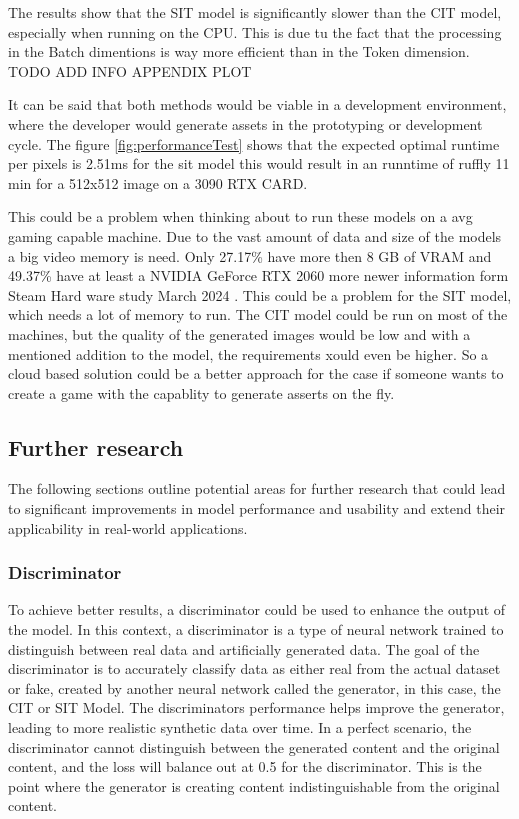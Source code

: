     The results show that the SIT model is significantly slower than the CIT model, especially when running on the CPU. This is due tu the fact that the processing in the Batch dimentions is way more efficient than in the Token dimension. TODO ADD INFO APPENDIX PLOT

    It can be said that both methods would be viable in a development environment, where the developer would generate assets in the prototyping or development cycle. The figure \autoref{fig:performanceTest} shows that the expected optimal runtime per pixels is 2.51ms for the sit model this would result in an runntime of ruffly 11 min for a 512x512 image on a 3090 RTX CARD.
    
    This could be a problem when thinking about to run these models on a avg gaming capable machine. Due to the vast amount of data and size of the models a big video memory is need. Only 27.17\% have more then 8 GB of VRAM and 49.37\% have at least a NVIDIA GeForce RTX 2060 more newer information form Steam Hard ware study March 2024 \autocite{Valve2024}. This could be a problem for the SIT model, which needs a lot of memory to run. The CIT   model could be run on most of the machines, but the quality of the generated images would be low and with a mentioned addition to the model, the requirements xould even be higher. So a cloud based solution could be a better approach for the case if someone wants to create a game with the capablity to generate asserts on the fly.


\subsection{Further research}

    The following sections outline potential areas for further research that could lead to significant improvements in model performance and usability and extend their applicability in real-world applications.

    \subsubsection{Discriminator}
    To achieve better results, a discriminator could be used to enhance the output of the model. In this context, a discriminator is a type of neural network trained to distinguish between real data and artificially generated data. The goal of the discriminator is to accurately classify data as either real from the actual dataset or fake, created by another neural network called the generator, in this case, the CIT or SIT Model. The discriminators performance helps improve the generator, leading to more realistic synthetic data over time. In a perfect scenario, the discriminator cannot distinguish between the generated content and the original content, and the loss will balance out at 0.5 for the discriminator. This is the point where the generator is creating content indistinguishable from the original content.

